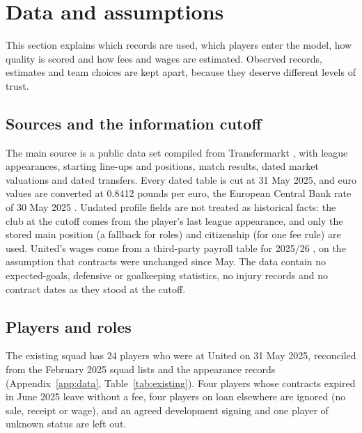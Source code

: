 \section{Data and assumptions}\label{sec:data}

This section explains which records are used, which players enter the model, how quality is scored and how fees and wages are estimated. Observed records, estimates and team choices are kept apart, because they deserve different levels of trust.

\subsection{Sources and the information cutoff}

The main source is a public data set compiled from Transfermarkt \citep{dcaribou2026,transfermarkt}, with league appearances, starting line-ups and positions, match results, dated market valuations and dated transfers. Every dated table is cut at 31 May 2025, and euro values are converted at 0.8412 pounds per euro, the European Central Bank rate of 30 May 2025 \citep{ecb2025}. Undated profile fields are not treated as historical facts: the club at the cutoff comes from the player's last league appearance, and only the stored main position (a fallback for roles) and citizenship (for one fee rule) are used. United's wages come from a third-party payroll table for 2025/26 \citep{spotrac2025}, on the assumption that contracts were unchanged since May. The data contain no expected-goals, defensive or goalkeeping statistics, no injury records and no contract dates as they stood at the cutoff.

\subsection{Players and roles}

The existing squad has 24 players who were at United on 31 May 2025, reconciled from the February 2025 squad lists \citep{pl2025lists} and the appearance records (Appendix~\ref{app:data}, Table~\ref{tab:existing}). Four players whose contracts expired in June 2025 leave without a fee, four players on loan elsewhere are ignored (no sale, receipt or wage), and an agreed development signing and one player of unknown status are left out.


